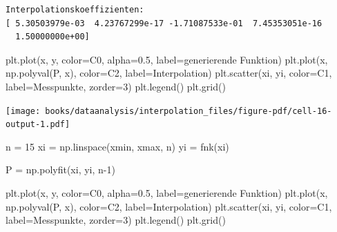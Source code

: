 \documentclass[
  letterpaper,
  DIV=11,
  numbers=noendperiod]{scrreprt}
\newenvironment{Shaded}{\begin{snugshade}}{\end{snugshade}}
\newcommand{\DecValTok}[1]{\textcolor[rgb]{0.68,0.00,0.00}{#1}}
\newcommand{\FloatTok}[1]{\textcolor[rgb]{0.68,0.00,0.00}{#1}}
\newcommand{\NormalTok}[1]{\textcolor[rgb]{0.00,0.23,0.31}{#1}}
\newcommand{\OperatorTok}[1]{\textcolor[rgb]{0.37,0.37,0.37}{#1}}
\newcommand{\StringTok}[1]{\textcolor[rgb]{0.13,0.47,0.30}{#1}}
\begin{document}
\begin{verbatim}
Interpolationskoeffizienten:
[ 5.30503979e-03  4.23767299e-17 -1.71087533e-01  7.45353051e-16
  1.50000000e+00]
\end{verbatim}

\begin{Shaded}
\begin{Highlighting}[]
\NormalTok{plt.plot(x, y, color}\OperatorTok{=}\StringTok{\textquotesingle{}C0\textquotesingle{}}\NormalTok{, alpha}\OperatorTok{=}\FloatTok{0.5}\NormalTok{, label}\OperatorTok{=}\StringTok{\textquotesingle{}generierende Funktion\textquotesingle{}}\NormalTok{)}
\NormalTok{plt.plot(x, np.polyval(P, x), color}\OperatorTok{=}\StringTok{\textquotesingle{}C2\textquotesingle{}}\NormalTok{, label}\OperatorTok{=}\StringTok{\textquotesingle{}Interpolation\textquotesingle{}}\NormalTok{)}
\NormalTok{plt.scatter(xi, yi, color}\OperatorTok{=}\StringTok{\textquotesingle{}C1\textquotesingle{}}\NormalTok{, label}\OperatorTok{=}\StringTok{\textquotesingle{}Messpunkte\textquotesingle{}}\NormalTok{, zorder}\OperatorTok{=}\DecValTok{3}\NormalTok{)}
\NormalTok{plt.legend()}
\NormalTok{plt.grid()}
\end{Highlighting}
\end{Shaded}

\texttt{[image: books/dataanalysis/interpolation\_files/figure-pdf/cell-16-output-1.pdf]}

\begin{Shaded}
\begin{Highlighting}[]
\NormalTok{n }\OperatorTok{=} \DecValTok{15}
\NormalTok{xi }\OperatorTok{=}\NormalTok{ np.linspace(xmin, xmax, n)}
\NormalTok{yi }\OperatorTok{=}\NormalTok{ fnk(xi)}

\NormalTok{P }\OperatorTok{=}\NormalTok{ np.polyfit(xi, yi, n}\OperatorTok{{-}}\DecValTok{1}\NormalTok{)}

\NormalTok{plt.plot(x, y, color}\OperatorTok{=}\StringTok{\textquotesingle{}C0\textquotesingle{}}\NormalTok{, alpha}\OperatorTok{=}\FloatTok{0.5}\NormalTok{, label}\OperatorTok{=}\StringTok{\textquotesingle{}generierende Funktion\textquotesingle{}}\NormalTok{)}
\NormalTok{plt.plot(x, np.polyval(P, x), color}\OperatorTok{=}\StringTok{\textquotesingle{}C2\textquotesingle{}}\NormalTok{, label}\OperatorTok{=}\StringTok{\textquotesingle{}Interpolation\textquotesingle{}}\NormalTok{)}
\NormalTok{plt.scatter(xi, yi, color}\OperatorTok{=}\StringTok{\textquotesingle{}C1\textquotesingle{}}\NormalTok{, label}\OperatorTok{=}\StringTok{\textquotesingle{}Messpunkte\textquotesingle{}}\NormalTok{, zorder}\OperatorTok{=}\DecValTok{3}\NormalTok{)}
\NormalTok{plt.legend()}
\NormalTok{plt.grid()}
\end{Highlighting}
\end{Shaded}
\end{document}
